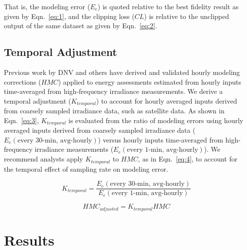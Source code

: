 \documentclass[conference]{IEEEtran}
\begin{document}
That is, the modeling error ($E_e$) is quoted relative to the best fidelity result as given by Eqn.~\ref{eq:1}, and the clipping loss ($\mathit{CL}$) is relative to the unclipped output of the same dataset as given by Eqn.~\ref{eq:2}.

\subsection{Temporal Adjustment}
Previous work by DNV and others have derived and validated hourly modeling corrections ($\mathit{HMC}$) \cite{Cormode2019,Bradford2020,Kharait2020,Anderson2020,Parikh2021} applied to energy assessments estimated from hourly inputs time-averaged from high-frequency irradiance measurements. We derive a temporal adjustment ($K_{temporal}$) to account for hourly averaged inputs derived from coarsely sampled irradiance data, such as satellite data. As shown in Eqn.~\ref{eq:3}, $K_{temporal}$ is evaluated from the ratio of modeling errors using hourly averaged inputs derived from coarsely sampled irradiance data ($E_e\left(\textrm{every 30-min, avg-hourly}\right)$) versus hourly inputs time-averaged from high-frequency irradiance measurements ($E_e\left(\textrm{every 1-min, avg-hourly}\right)$). We recommend analysts apply $K_{temporal}$ to $\mathit{HMC}$, as in Eqn.~\ref{eq:4}, to account for the temporal effect of sampling rate on modeling error.

\begin{equation} \label{eq:3}
K_{temporal} = \frac{E_e\left(\textrm{every 30-min, avg-hourly}\right)}{E_e\left(\textrm{every 1-min, avg-hourly}\right)}
\end{equation}

\begin{equation} \label{eq:4}
\mathit{HMC}_{adjusted} = K_{temporal} \mathit{HMC}
\end{equation}

\section{Results}
\label{section:results}
\end{document}
